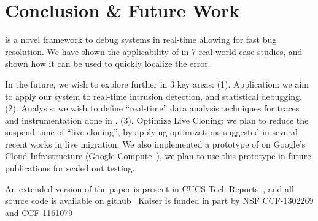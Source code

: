 \section{Conclusion \& Future Work}
\label{sec:conclusion}


\parikshan is a novel framework to debug systems in real-time allowing for fast bug resolution.
We have shown the applicability of \parikshan in  7 real-world case studies, and shown how it can be used to quickly localize the error.

In the future, we wish to explore \parikshan further in 3 key areas: (1). Application: we aim to apply our system to real-time intrusion detection, and statistical debugging.
(2). Analysis: we wish to define ``real-time'' data analysis techniques for traces and instrumentation done in \parikshan.
(3). Optimize Live Cloning: we plan to reduce the suspend time of ``live cloning'', by applying optimizations suggested in several recent works in live migration.
We also implemented a prototype of \parikshan on Google's Cloud Infrastructure (Google Compute~\cite{gcompute}), we plan to use this prototype in future publications for scaled out testing. 

An extended version of the paper is present in CUCS Tech Reports~\cite{parikshanTR,parikshan}, and all source code is available on github~\cite{github} 
Kaiser is funded in part by NSF CCF-1302269 and CCF-1161079
